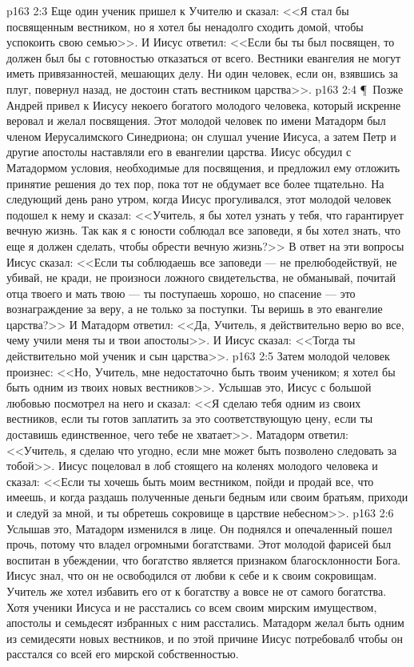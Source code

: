 \vs p163 2:3 Еще один ученик пришел к Учителю и сказал: <<Я стал бы посвященным вестником, но я хотел бы ненадолго сходить домой, чтобы успокоить свою семью>>. И Иисус ответил: <<Если бы ты был посвящен, то должен был бы с готовностью отказаться от всего. Вестники евангелия не могут иметь привязанностей, мешающих делу. Ни один человек, если он, взявшись за плуг, повернул назад, не достоин стать вестником царства>>.
\vs p163 2:4 \P\ Позже Андрей привел к Иисусу некоего богатого молодого человека, который искренне веровал и желал посвящения. Этот молодой человек по имени Матадорм был членом Иерусалимского Синедриона; он слушал учение Иисуса, а затем Петр и другие апостолы наставляли его в евангелии царства. Иисус обсудил с Матадормом условия, необходимые для посвящения, и предложил ему отложить принятие решения до тех пор, пока тот не обдумает все более тщательно. На следующий день рано утром, когда Иисус прогуливался, этот молодой человек подошел к нему и сказал: <<Учитель, я бы хотел узнать у тебя, что гарантирует вечную жизнь. Так как я с юности соблюдал все заповеди, я бы хотел знать, что еще я должен сделать, чтобы обрести вечную жизнь?>> В ответ на эти вопросы Иисус сказал: <<Если ты соблюдаешь все заповеди --- не прелюбодействуй, не убивай, не кради, не произноси ложного свидетельства, не обманывай, почитай отца твоего и мать твою --- ты поступаешь хорошо, но спасение --- это вознаграждение за веру, а не только за поступки. Ты веришь в это евангелие царства?>> И Матадорм ответил: <<Да, Учитель, я действительно верю во все, чему учили меня ты и твои апостолы>>. И Иисус сказал: <<Тогда ты действительно мой ученик и сын царства>>.
\vs p163 2:5 Затем молодой человек произнес: <<Но, Учитель, мне недостаточно быть твоим учеником; я хотел бы быть одним из твоих новых вестников>>. Услышав это, Иисус с большой любовью посмотрел на него и сказал: <<Я сделаю тебя одним из своих вестников, если ты готов заплатить за это соответствующую цену, если ты доставишь единственное, чего тебе не хватает>>. Матадорм ответил: <<Учитель, я сделаю что угодно, если мне может быть позволено следовать за тобой>>. Иисус поцеловал в лоб стоящего на коленях молодого человека и сказал: <<Если ты хочешь быть моим вестником, пойди и продай все, что имеешь, и когда раздашь полученные деньги бедным или своим братьям, приходи и следуй за мной, и ты обретешь сокровище в царствие небесном>>.
\vs p163 2:6 Услышав это, Матадорм изменился в лице. Он поднялся и опечаленный пошел прочь, потому что владел огромными богатствами. Этот молодой фарисей был воспитан в убеждении, что богатство является признаком благосклонности Бога. Иисус знал, что он не освободился от любви к себе и к своим сокровищам. Учитель же хотел избавить его от  к богатству а вовсе не от самого богатства. Хотя ученики Иисуса и не расстались со всем своим мирским имуществом, апостолы и семьдесят избранных с ним расстались. Матадорм желал быть одним из семидесяти новых вестников, и по этой причине Иисус потребовалб чтобы он расстался со всей его мирской собственностью.
